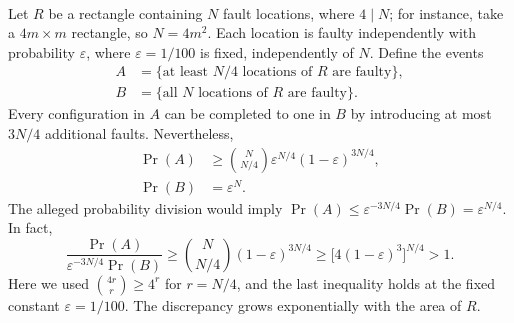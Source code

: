 \documentclass[manuscript,screen,review]{acmart}
\begin{document}
\paragraph{}

Let $R$ be a rectangle containing $N$ fault locations, where
$4\mid N$; for instance, take a $4m\times m$ rectangle, so
$N=4m^2$. Each location is faulty independently with probability
$\varepsilon$, where $\varepsilon=1/100$ is fixed, independently of $N$.
Define the events
\begin{align}
 A&=\{\text{at least $N/4$ locations of $R$ are faulty}\},\\
 B&=\{\text{all $N$ locations of $R$ are faulty}\}.
\end{align}
Every configuration in $A$ can be completed to one in $B$ by
introducing at most $3N/4$ additional faults. Nevertheless,
\begin{align}
 \Pr(A)
 &\ge {N\choose N/4}\varepsilon^{N/4}
             (1-\varepsilon)^{3N/4},\\
 \Pr(B)&=\varepsilon^N.
\end{align}
The alleged probability division would imply
$\Pr(A)\le\varepsilon^{-3N/4}\Pr(B)=\varepsilon^{N/4}$.
In fact,
\begin{equation}\label{eq:completion-multiplicity}
 \frac{\Pr(A)}{\varepsilon^{-3N/4}\Pr(B)}
 \ge {N\choose N/4}(1-\varepsilon)^{3N/4}
 \ge \bigl[4(1-\varepsilon)^3\bigr]^{N/4}>1.
\end{equation}
Here we used ${4r\choose r}\ge 4^r$ for $r=N/4$, and the last inequality holds at the fixed constant $\varepsilon=1/100$.  The discrepancy grows exponentially with the area of $R$.

\end{document}
